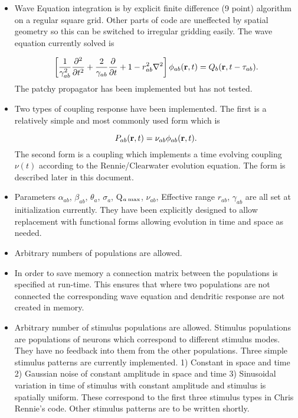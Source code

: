 \documentclass[12pt,a4paper]{article}
\begin{document}
\begin{itemize}
\item Wave Equation integration is by explicit finite difference (9 point) algorithm
   on a regular square grid. Other parts of code are uneffected by spatial
   geometry so this can be switched to irregular gridding easily. The wave equation
   currently solved is 

\begin{equation}
\left[\frac{1}{\gamma_{ab}^2}\frac{\partial^2}{\partial t^2}+\frac{2}{\gamma_{ab}}\frac{\partial}
{\partial t}+1-r_{ab}^2\nabla^2 \right] \phi_{ab}({\bf r},t)
=Q_b({\bf r},t-\tau_{ab}).
\end{equation}
The patchy propagator has been implemented but has not tested.

\item Two types of coupling response have been implemented.
The first is a relatively simple and most commonly used form which is

\begin{equation}
P_{ab}({\bf r}, t) = \nu_{ab} \phi_{ab}({\bf r}, t).
\label{eq:simplecoupling}
\end{equation}
The second form is a coupling which implements a time evolving coupling $\nu(t)$
according to the Rennie/Clearwater evolution equation. The form is described later
in this document.

\item Parameters $\alpha_{ab}$, $\beta_{ab}$, $\theta_{a}$, $\sigma_{a}$, Q$_{a \: \rm{max}}$,
  $\nu_{ab}$, Effective range $r_{ab}$, $\gamma_{ab}$
  are all set at initialization currently. They have been explicitly
  designed to allow replacement with functional forms allowing evolution
  in time and space as needed.
  
\item Arbitrary numbers of populations are allowed.

\item In order to save memory a connection matrix between the populations is
   specified at run-time. This ensures that where two populations are not
   connected the corresponding wave equation and dendritic response are
   not created in memory.

\item Arbitrary number of stimulus populations are allowed. Stimulus populations
  are populations of neurons which correspond to different stimulus 
  modes. They have no feedback into them from the other populations.
  Three simple stimulus patterns are currently implemented.
  1) Constant in space and time 2) Gaussian noise of constant amplitude
  in space and time 3) Sinusoidal variation in time of stimulus with constant
  amplitude and stimulus is spatially uniform.
  These correspond to the first three stimulus types in Chris Rennie's code.
  Other stimulus patterns are to be written shortly.
  
\end{itemize}
 
\end{document}
